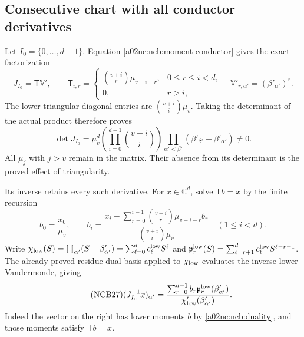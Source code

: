 \documentclass[11pt,a4paper]{article}
\begin{document}
\subsection{Consecutive chart with all conductor derivatives}
Let $I_0=\{0,\ldots,d-1\}$. Equation \eqref{a02nc:ncb:moment-conductor}
gives the exact factorization
\begin{equation}\tag{NCB24}\label{a02nc:ncb:triangular}
J_{I_0}=\mathsf T\mathbb V',\qquad
\mathsf T_{i,r}=
\begin{cases}\binom{v+i}{r}\mu_{v+i-r},&0\leq r\leq i<d,\\
0,&r>i,\end{cases}
\quad \mathbb V'_{r,\alpha'}=(\beta'_{\alpha'})^r .
\end{equation}
The lower-triangular diagonal entries are
$\binom{v+i}{i}\mu_v$. Taking the determinant of the actual product
therefore proves
\begin{equation}\tag{NCB25}\label{a02nc:ncb:consecutive-det}
\det J_{I_0}
=\mu_v^d\left(\prod_{i=0}^{d-1}\binom{v+i}{i}\right)
 \prod_{\alpha'<\beta'}(\beta'_{\beta'}-\beta'_{\alpha'})\ne0 .
\end{equation}
All $\mu_j$ with $j>v$ remain in the matrix. Their absence from its
determinant is the proved effect of triangularity.

Its inverse retains every such derivative. For $x\in\mathbb C^d$,
solve $\mathsf T b=x$ by the finite recursion
\begin{equation}\tag{NCB26}\label{a02nc:ncb:triangular-inverse}
b_0=\frac{x_0}{\mu_v},\qquad
b_i=\frac{x_i-\sum_{r=0}^{i-1}
          \binom{v+i}{r}\mu_{v+i-r}b_r}
          {\binom{v+i}{i}\mu_v}\quad(1\leq i<d).
\end{equation}
Write
$\chi_{\rm low}(S)=\prod_{\alpha'}(S-\beta'_{\alpha'})
=\sum_{\ell=0}^{d}c_\ell^{\rm low}S^\ell$
and
$\mathfrak p_r^{\rm low}(S)
=\sum_{\ell=r+1}^{d}c_\ell^{\rm low}S^{\ell-r-1}$.
The already proved residue-dual basis applied to $\chi_{\rm low}$
evaluates the inverse lower Vandermonde, giving
\begin{equation}\tag{NCB27}\label{a02nc:ncb:full-inverse}
(J_{I_0}^{-1}x)_{\alpha'}
=\frac{\sum_{r=0}^{d-1}b_r\mathfrak p_r^{\rm low}(\beta'_{\alpha'})}
          {\chi_{\rm low}'(\beta'_{\alpha'})}.
\end{equation}
Indeed the vector on the right has lower moments $b$ by
\eqref{a02nc:ncb:duality}, and those moments satisfy $\mathsf T b=x$.
\end{document}
